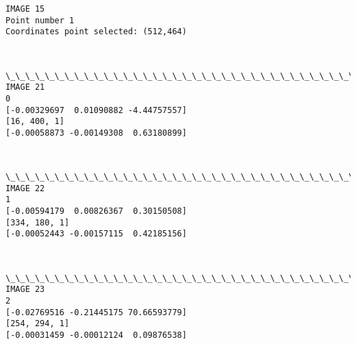 \documentclass[11pt]{article}
\begin{document}
    \begin{Verbatim}[commandchars=\\\{\}]
IMAGE 15
Point number 1
Coordinates point selected: (512,464)

    \end{Verbatim}

    \begin{center}
    \end{center}
    { \hspace*{\fill} \\}
    
    \begin{Verbatim}[commandchars=\\\{\}]
\_\_\_\_\_\_\_\_\_\_\_\_\_\_\_\_\_\_\_\_\_\_\_\_\_\_\_\_\_\_\_\_\_\_\_\_\_\_\_\_\_\_\_\_\_\_\_\_\_\_\_\_\_\_\_\_\_\_\_\_
IMAGE 21
0
[-0.00329697  0.01090882 -4.44757557]
[16, 400, 1]
[-0.00058873 -0.00149308  0.63180899]

    \end{Verbatim}

    \begin{center}
    \end{center}
    { \hspace*{\fill} \\}
    
    \begin{Verbatim}[commandchars=\\\{\}]
\_\_\_\_\_\_\_\_\_\_\_\_\_\_\_\_\_\_\_\_\_\_\_\_\_\_\_\_\_\_\_\_\_\_\_\_\_\_\_\_\_\_\_\_\_\_\_\_\_\_\_\_\_\_\_\_\_\_\_\_
IMAGE 22
1
[-0.00594179  0.00826367  0.30150508]
[334, 180, 1]
[-0.00052443 -0.00157115  0.42185156]

    \end{Verbatim}

    \begin{center}
    \end{center}
    { \hspace*{\fill} \\}
    
    \begin{Verbatim}[commandchars=\\\{\}]
\_\_\_\_\_\_\_\_\_\_\_\_\_\_\_\_\_\_\_\_\_\_\_\_\_\_\_\_\_\_\_\_\_\_\_\_\_\_\_\_\_\_\_\_\_\_\_\_\_\_\_\_\_\_\_\_\_\_\_\_
IMAGE 23
2
[-0.02769516 -0.21445175 70.66593779]
[254, 294, 1]
[-0.00031459 -0.00012124  0.09876538]

    \end{Verbatim}
\end{document}
